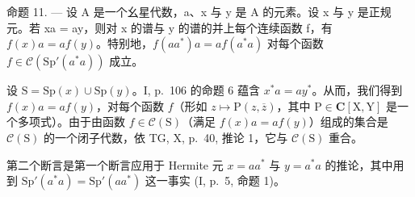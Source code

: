 命题 11. --- 设 A 是一个幺星代数，a、x 与 y 是 A 的元素。设 x 与 y 是正规元。若 xa = ay，则对 x 的谱与 y 的谱的并上每个连续函数 f，有 \(f(x)a = af(y)\)。特别地，\(f(aa^{*})a = af(a^{*}a)\) 对每个函数 \(f \in \mathcal{C}(\mathrm{Sp}'(a^{*}a))\) 成立。

设 \(\mathrm{S} = \mathrm{Sp}(x) \cup \mathrm{Sp}(y)\)。I, p.~106 的命题 6 蕴含 \(x^{*}a = ay^{*}\)。从而，我们得到 \(f(x)a = af(y)\)，对每个函数 \(f\)（形如 \(z \mapsto \mathrm{P}(z,\overline{z})\)，其中 \(\mathrm{P} \in \mathbf{C}[\mathrm{X},\mathrm{Y}]\) 是一个多项式）。由于由函数 \(f \in \mathcal{C}(\mathrm{S})\)（满足 \(f(x)a = af(y)\)）组成的集合是 \(\mathcal{C}(\mathrm{S})\) 的一个闭子代数，依 TG, X, p.~40, 推论 1，它与 \(\mathcal{C}(\mathrm{S})\) 重合。

第二个断言是第一个断言应用于 Hermite 元 \(x = aa^{*}\) 与 \(y = a^{*}a\) 的推论，其中用到 \(\mathrm{Sp}'(a^{*}a) = \mathrm{Sp}'(aa^{*})\) 这一事实 (I, p.~5, 命题 1)。

